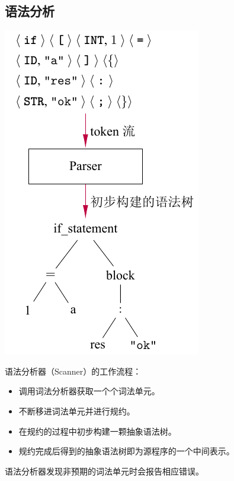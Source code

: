 \documentclass[dvipsnames, svgnames, x11names]{beamer}
\begin{document}
\subsection{语法分析}
\begin{frame}
    \begin{minipage}{.4\linewidth}
    \includegraphics[width=\linewidth]{../figure/parser1.pdf}
    \end{minipage}
    \quad
    \begin{minipage}{.55\linewidth}
    \onslide<+->语法分析器（Scanner）的工作流程：
    \begin{itemize}[<+->]
        \item 调用词法分析器获取一个个词法单元。
        \item 不断移进词法单元并进行规约。
        \item 在规约的过程中初步构建一颗抽象语法树。
        \item 规约完成后得到的抽象语法树即为源程序的一个中间表示。
    \end{itemize}
    \onslide<+->语法分析器发现\alert{非预期}的词法单元时会报告相应错误。
    \end{minipage}
\end{frame}
\end{document}
